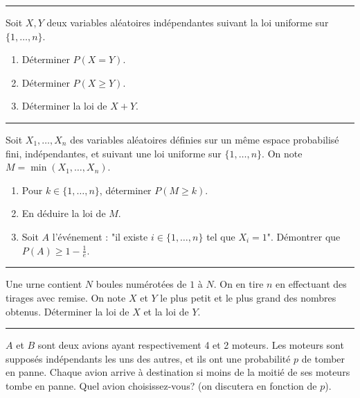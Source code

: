 \documentclass[../PolyS4.tex]{subfiles}
\begin{document}
\hfill\break
\hrule
\hfill\break


Soit $X,Y$ deux variables aléatoires indépendantes suivant la loi uniforme sur $\{1,\dots,n\}$. 
\begin{enumerate}
\item Déterminer $P(X=Y)$.
\item Déterminer $P(X\geq Y)$.
\item Déterminer la loi de $X+Y$.\\
\end{enumerate}


\hfill\break
\hrule
\hfill\break
\newpage


Soit $X_1,\dots,X_n$ des variables aléatoires définies sur un même espace probabilisé fini, indépendantes, et suivant une loi uniforme sur $\{1,\dots,n\}$.
On note $M=\min(X_1,\dots,X_n)$.
\begin{enumerate}
\item Pour $k\in\{1,\dots,n\}$, déterminer $P(M\geq k)$.
\item En déduire la loi de $M$.
\item Soit $A$ l'événement : "il existe $i\in\{1,\dots,n\}$ tel que $X_i=1$". Démontrer que $P(A)\geq 1-\frac 1e$.\\ 
\end{enumerate}


\hfill\break
\hrule
\hfill\break



Une urne contient $N$ boules numérotées de $1$ à $N$. On en tire $n$ en effectuant des tirages avec remise. On note $X$ et $Y$ le plus petit et le plus grand des nombres obtenus. Déterminer la loi de $X$ et la loi de $Y$.\\



\hfill\break
\hrule
\hfill\break
{}

$A$ et $B$ sont deux avions ayant respectivement 4 et 2 moteurs. Les moteurs sont supposés indépendants les uns des autres, et ils ont une probabilité $p$ de tomber en panne.
Chaque avion arrive à destination si moins de la moitié de ses moteurs tombe en panne. Quel avion choisissez-vous? (on discutera en fonction de $p$).\\
\end{document}
